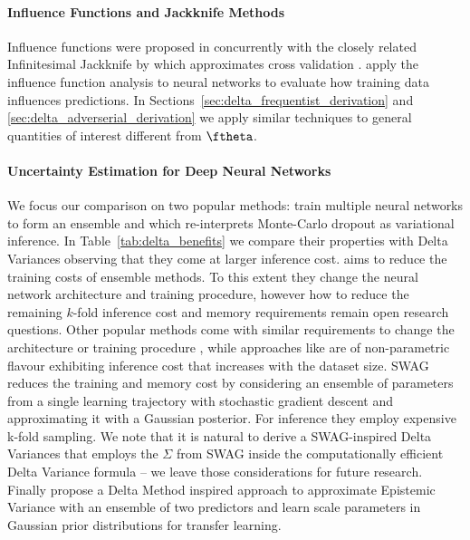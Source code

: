 \paragraph{Influence Functions and Jackknife Methods}
Influence functions were proposed in \citet{Hampel:1974Influence} concurrently with the closely related Infinitesimal Jackknife by \citet{Jaeckel:1972InfinitesimalJackknife} which approximates cross validation \cite{Quenouille:1949Correlation}. \citet{Koh:2017UnderstandingBlackBox} apply the influence function analysis to neural networks to evaluate how training data influences predictions. In Sections~\ref{sec:delta_frequentist_derivation} and \ref{sec:delta_adverserial_derivation} we apply similar techniques to general quantities of interest different from $\ftheta$.


\paragraph{Uncertainty Estimation for Deep Neural Networks}
We focus our comparison on two popular methods: \citet{Lakshminarayanan2017:ensembles} train multiple neural networks to form an ensemble and \citet{Gal2016:dropout} which re-interprets Monte-Carlo dropout as variational inference. In Table~\ref{tab:delta_benefits} we compare their properties with Delta Variances observing that they come at larger inference cost.
\citet{Osband2023:EpistemicNeuralNetworks} aims to reduce the training costs of ensemble methods. To this extent they change the neural network architecture and training procedure, however how to reduce the remaining $k$-fold inference cost and memory requirements remain open research questions. Other popular methods come with similar requirements to change the architecture or training procedure \citep{blundell2015:BBB,Amersfoort:2020UncertaintyDUQ,Immer:2021LocalLinearization},
while approaches like \citet{Sun:2022OOD} are of non-parametric flavour exhibiting inference cost that increases with the dataset size. 
%
SWAG \cite{Maddox2019:SWAG} reduces the training and memory cost by considering an ensemble of parameters from a single learning trajectory with stochastic gradient descent and approximating it with a Gaussian posterior. For inference they employ expensive k-fold sampling. We note that it is natural to derive a SWAG-inspired Delta Variances that employs the $\Sigma$ from SWAG inside the computationally efficient Delta Variance formula -- we leave those considerations for future research.
%
Finally
\citet{Kallus2022:Implicit} propose a Delta Method inspired approach to approximate Epistemic Variance with an ensemble of two predictors and \citet{Schnaus:2023LearningPriors} learn scale parameters in Gaussian prior distributions for transfer learning.